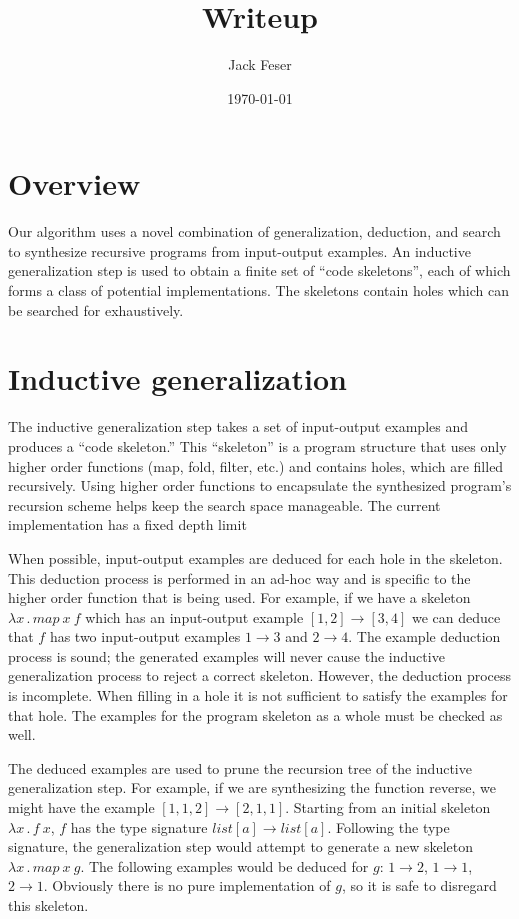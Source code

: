 \documentclass[11pt]{article}
\author{Jack Feser}
\date{\today}
\title{Writeup}
\begin{document}
\lstset{language=ML}

\tableofcontents

\section{Overview}
\label{sec-1}
Our algorithm uses a novel combination of generalization, deduction,
and search to synthesize recursive programs from input-output
examples. An inductive generalization step is used to obtain a finite
set of ``code skeletons'', each of which forms a class of potential
implementations. The skeletons contain holes which can be searched for
exhaustively.

\section{Inductive generalization}
\label{sec-2}
The inductive generalization step takes a set of input-output examples
and produces a ``code skeleton.'' This ``skeleton'' is a program
structure that uses only higher order functions (map, fold, filter,
etc.) and contains holes, which are filled recursively. Using higher
order functions to encapsulate the synthesized program's recursion
scheme helps keep the search space manageable. The current
implementation has a fixed depth limit

When possible, input-output examples are deduced for each hole in the
skeleton. This deduction process is performed in an ad-hoc way and is
specific to the higher order function that is being used. For example,
if we have a skeleton $\lambda x\,.\,map~x~f$ which has an
input-output example $[1, 2] \rightarrow [3, 4]$ we can deduce that
$f$ has two input-output examples $1 \rightarrow 3$ and $2 \rightarrow
4$. The example deduction process is sound; the generated examples
will never cause the inductive generalization process to reject a
correct skeleton. However, the deduction process is incomplete. When
filling in a hole it is not sufficient to satisfy the examples for
that hole. The examples for the program skeleton as a whole must be
checked as well.

The deduced examples are used to prune the recursion tree of the
inductive generalization step. For example, if we are synthesizing the
function reverse, we might have the example $[1,1,2] \rightarrow
[2,1,1]$. Starting from an initial skeleton $\lambda x\,.\,f~x$, $f$
has the type signature $list[a] \rightarrow list[a]$. Following the
type signature, the generalization step would attempt to generate a
new skeleton $\lambda x\,.\,map~x~g$. The following examples would be
deduced for $g$: $1 \rightarrow 2$, $1 \rightarrow 1$, $2 \rightarrow
1$. Obviously there is no pure implementation of $g$, so it is safe to
disregard this skeleton.
\end{document}
